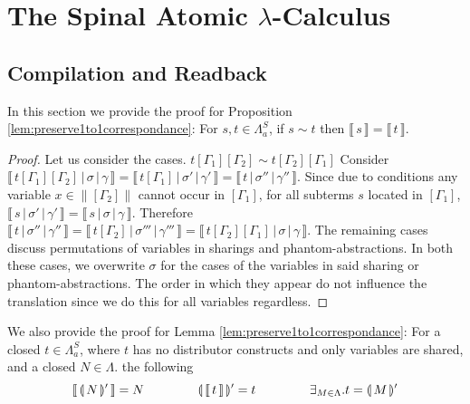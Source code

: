 \documentclass[a4paper,UKenglish,cleveref, autoref]{lipics-v2019}
\newcommand{\FALC}{\Lambda^{S}_{a}}
\newcommand{\readback}[2]{\llbracket \, #1 \, \rrbracket}
\newcommand{\compile}[1]{\llparenthesis \, #1 \, \rrparenthesis}
\newcommand{\trans}[1]{\llbracket \, #1 \, \rrbracket}
\newcommand{\readbackwmap}[3]{\llbracket \, #1 \, \vert \, #2 \, \vert \, #3  \, \rrbracket }
\newcommand{\bindvars}[1]{\parallel#1\parallel}
\begin{document}


\newpage

\appendix

\section{The Spinal Atomic $\lambda$-Calculus}

\subsection{Compilation and Readback}

In this section we provide the proof for Proposition \ref{lem:preserve1to1correspondance}: For $s, t \in \FALC$, if $s \sim t$ then $\trans{s} = \trans{t}$.

\begin{proof}
Let us consider the cases. 
\newline
\newline
$t[\Gamma_{1}][\Gamma_{2}] \sim t[\Gamma_{2}][\Gamma_{1}]$
\newline
Consider $\readbackwmap{t[\Gamma_{1}][\Gamma_{2}]}{\sigma}{\gamma} = \readbackwmap{t[\Gamma_{1}]}{\sigma'}{\gamma'} = \readbackwmap{t}{\sigma''}{\gamma''}$. Since due to conditions any variable $x \in \bindvars{[\Gamma_{2}]}$ cannot occur in $[\Gamma_{1}]$, for all subterms $s$ located in $[\Gamma_{1}]$, $\readbackwmap{s}{\sigma'}{\gamma'} = \readbackwmap{s}{\sigma}{\gamma}$. Therefore $\readbackwmap{t}{\sigma''}{\gamma''} = \readbackwmap{t[\Gamma_{2}]}{\sigma'''}{\gamma'''} = \readbackwmap{t[\Gamma_{2}][\Gamma_{1}]}{\sigma}{\gamma}$.
\newline
\newline
The remaining cases discuss permutations of variables in sharings and phantom-abstractions. In both these cases, we overwrite $\sigma$ for the cases of the variables in said sharing or phantom-abstractions. The order in which they appear do not influence the translation since we do this for all variables regardless. 
\end{proof}

We also provide the proof for Lemma \ref{lem:preserve1to1correspondance}: For a closed $t \in \FALC$, where $t$ has no distributor constructs and only variables are shared, and a closed $N \in \Lambda$. the following 
$$\readback{\compile{N}'}{I} = N \hspace{1.5cm} \compile{\readback{t}{I}}' = t \hspace{1.5cm} \exists_{ M \in \Lambda} . t = \compile{M}'$$ 
\end{document}
